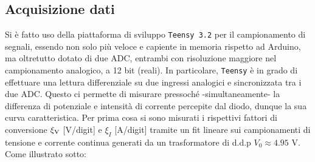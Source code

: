 \documentclass{article}[a4paper, oneside, 11pt]
\begin{document}
\subsection{Acquisizione dati}
Si è fatto uso della piattaforma di sviluppo \verb+Teensy 3.2+\cite{teensy} per
il campionamento di segnali, essendo non solo più veloce e capiente in memoria
rispetto ad Arduino, ma oltretutto dotato di due ADC, entrambi con risoluzione
maggiore nel campionamento analogico, a 12 bit (reali). In particolare, 
\verb+Teensy+ è in grado di effettuare una lettura differenziale su due ingressi
analogici e sincronizzata tra i due ADC. Questo ci permette di misurare
pressoché -simultaneamente- la differenza di potenziale e intensità di corrente
percepite dal diodo, dunque la sua curva caratteristica. Per prima cosa
si sono misurati i rispettivi fattori di conversione $\xi_{\rm V}$ [V/digit] e
$\xi_I$ [A/digit] tramite un fit lineare sui campionamenti di tensione e
corrente continua generati da un trasformatore di d.d.p $V_0 \approx 4.95$ V.
Come illustrato sotto:

\end{document}
